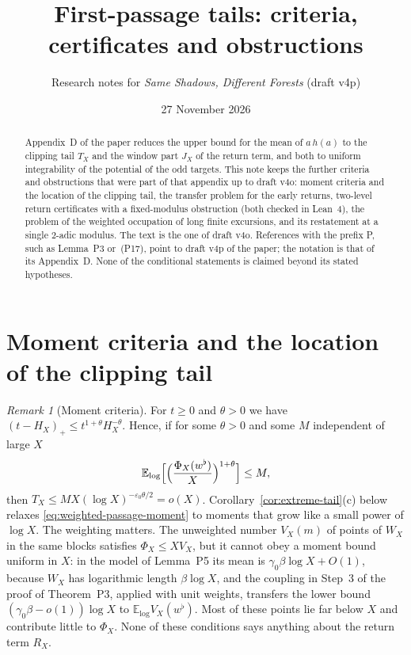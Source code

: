 \documentclass[11pt]{article}
\title{First-passage tails: criteria, certificates and obstructions}
\author{Research notes for \emph{Same Shadows, Different Forests} (draft v4p)}
\date{27 November 2026}
\theoremstyle{remark}
\newtheorem{remark}[theorem]{Remark}
\begin{document}
\maketitle

\begin{abstract}
Appendix~D of the paper reduces the upper bound for the mean of $a\,h(a)$ to the clipping tail $T_X$ and the window part $J_X$ of the return term, and both to uniform integrability of the potential of the odd targets. This note keeps the further criteria and obstructions that were part of that appendix up to draft v4o: moment criteria and the location of the clipping tail, the transfer problem for the early returns, two-level return certificates with a fixed-modulus obstruction (both checked in Lean~4), the problem of the weighted occupation of long finite excursions, and its restatement at a single $2$-adic modulus. The text is the one of draft v4o. References with the prefix P, such as Lemma~P3 or~(P17), point to draft v4p of the paper; the notation is that of its Appendix~D. None of the conditional statements is claimed beyond its stated hypotheses.
\end{abstract}

\section{Moment criteria and the location of the clipping tail}

\begin{remark}[Moment criteria]
\label{rem:moment-criterion}
For $t\ge0$ and $\theta>0$ we have $(t-H_X)_+\le t^{1+\theta}H_X^{-\theta}$.
Hence, if for some $\theta>0$ and some $M$ independent of large $X$
\begin{equation}\label{eq:weighted-passage-moment}
  \mathbb E_{\log}\Bigl[\Bigl(\frac{\Phi_X(w^\flat)}{X}\Bigr)^{1+\theta}\Bigr]\le M,
\end{equation}
then $T_X\le MX(\log X)^{-\varepsilon_0\theta/2}=o(X)$.
Corollary~\ref{cor:extreme-tail}(c) below relaxes
\eqref{eq:weighted-passage-moment} to moments that grow like a small power
of $\log X$. The weighting matters. The unweighted number $V_X(m)$ of
points of $W_X$ in the same blocks satisfies $\Phi_X\le XV_X$, but it
cannot obey a moment bound uniform in $X$: in the model of
Lemma~P5 its mean is $\gamma_0\beta\log X+O(1)$, because
$W_X$ has logarithmic length $\beta\log X$, and the coupling in Step~3 of
the proof of Theorem~P3, applied with unit weights, transfers
the lower bound $(\gamma_0\beta-o(1))\log X$ to
$\mathbb E_{\log}V_X(w^\flat)$. Most of these points lie far below $X$ and
contribute little to $\Phi_X$. None of these conditions says anything
about the return term $R_X$.
\end{remark}
\end{document}
